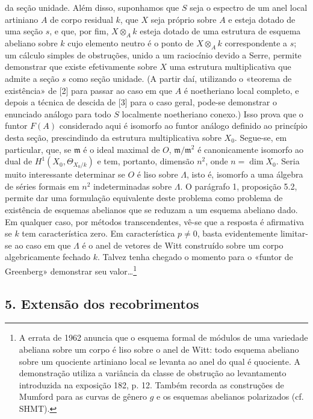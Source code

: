 \documentclass[11pt,twoside,openany]{book}
\numberwithin{equation}{section}
\newcommand{\src}[1]{%
  \phantomsection\hypertarget{src:#1}{}%
  \marginpar{\raggedleft\footnotesize\sffamily #1}%
}
\theoremstyle{plain}
\theoremstyle{definition}
\theoremstyle{remark}
\newcommand{\FgaUnitKey}{frontmatter}
\renewcommand{\src}[1]{%
  \phantomsection\hypertarget{src:\FgaUnitKey:#1}{}%
  \marginpar{\raggedleft\footnotesize\sffamily #1}%
}
\begin{document}
\src{387}
da seção unidade. Além disso, suponhamos que $S$ seja o espectro de um anel
local artiniano $A$ de corpo residual $k$, que $X$ seja próprio sobre $A$ e esteja
dotado de uma seção $s$, e que, por fim, $X\otimes_Ak$ esteja dotado de uma
estrutura de esquema abeliano sobre $k$ cujo elemento neutro é o ponto de
$X\otimes_Ak$ correspondente a $s$; um cálculo simples de obstruções,
unido a um raciocínio devido a Serre, permite demonstrar que existe
efetivamente sobre $X$ uma estrutura multiplicativa que admite a seção
$s$ como seção unidade. (A partir daí, utilizando o «teorema de
existência» de [2] para passar ao caso em que $A$ é noetheriano local completo,
e depois a técnica de descida de [3] para o caso geral, pode-se demonstrar
o enunciado análogo para todo $S$ localmente noetheriano conexo.) Isso prova
que o funtor $F(A)$ considerado aqui é isomorfo ao funtor análogo definido ao
princípio desta seção, prescindindo da estrutura multiplicativa sobre
$X_0$. Segue-se, em particular, que, se $\mathfrak m$ é o ideal maximal de
$O$, $\mathfrak m/\mathfrak m^2$ é canonicamente isomorfo ao dual de
$H^1(X_0,\Theta_{X_0/k})$ e tem, portanto, dimensão $n^2$, onde
$n=\dim X_0$. Seria muito interessante determinar se $O$ é liso sobre $\Lambda$,
isto é, isomorfo a uma álgebra de séries formais em $n^2$ indeterminadas
sobre $\Lambda$. O parágrafo 1, proposição 5.2, permite dar uma formulação
equivalente deste problema como problema de existência de esquemas abelianos
que se reduzam a um esquema abeliano dado. Em qualquer caso, por métodos
transcendentes, vê-se que a resposta é afirmativa se $k$ tem característica
zero. Em característica $p\ne0$, basta evidentemente limitar-se ao caso em que
$\Lambda$ é o anel de vetores de Witt construído sobre um corpo
algebricamente fechado $k$. Talvez tenha chegado o momento para o «funtor
de Greenberg» demonstrar seu valor\ldots\footnote{A errata de 1962
anuncia que o esquema formal de módulos de uma variedade abeliana sobre um
corpo é liso sobre o anel de Witt: todo esquema abeliano sobre um quociente
artiniano local se levanta ao anel do qual é quociente. A demonstração
utiliza a variância da classe de obstrução ao levantamento introduzida na
exposição 182, p. 12. Também recorda as construções de Mumford para
as curvas de gênero $g$ e os esquemas abelianos polarizados (cf. SHMT).}

\subsection*{5. Extensão dos recobrimentos}
\end{document}
